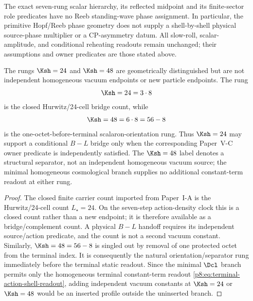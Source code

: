 \documentclass[12pt,a4paper]{article}
\begin{document}
\begin{remark}
The exact seven-rung scalar hierarchy, its reflected midpoint and its
finite-sector role predicates have no Reeb standing-wave phase assignment.
In particular, the primitive Hopf/Reeb phase geometry does not supply a
shell-by-shell physical source-phase multiplier or a CP-asymmetry datum.
All slow-roll, scalar-amplitude, and conditional reheating readouts remain
unchanged; their assumptions and owner predicates are those stated above.
\end{remark}


\begin{corollary}
\label{p8:cor:protected-noncarrier-rungs-K24-K48}
The rungs \(\Ksh=24\) and \(\Ksh=48\) are geometrically distinguished but are not independent homogeneous vacuum endpoints or new particle endpoints.  The rung
\begin{equation}
\Ksh=24=3\cdot 8
\end{equation}
is the closed Hurwitz/24-cell bridge count, while
\begin{equation}
\Ksh=48=6\cdot8=56-8
\end{equation}
is the one-octet-before-terminal scalaron-orientation rung.  Thus \(\Ksh=24\) may support a conditional \(B-L\) bridge only when the
corresponding Paper~V-C owner predicate is independently satisfied.
The \(\Ksh=48\) label denotes a structural separator, not an independent
homogeneous vacuum source; the minimal homogeneous cosmological branch
supplies no additional constant-term readout at either rung.
\end{corollary}

\begin{proof}
The closed finite carrier count imported from Paper~I-A is the Hurwitz/24-cell count \(L_\star=24\).  On the seven-step action-density clock this is a closed count rather than a new endpoint; it is therefore available as a bridge/complement count.  A physical \(B-L\) handoff requires its independent source/action predicate, and the count is not a second vacuum constant.  Similarly, \(\Ksh=48=56-8\) is singled out by removal of one protected octet from the terminal index.  It is consequently the natural orientation/separator rung immediately before the terminal static readout.  Since the minimal \(\Dcl\) branch permits only the homogeneous terminal constant-term readout \eqref{p8:eq:terminal-action-shell-readout}, adding independent vacuum constants at \(\Ksh=24\) or \(\Ksh=48\) would be an inserted profile outside the uninserted branch.\qedhere
\end{proof}
\end{document}
